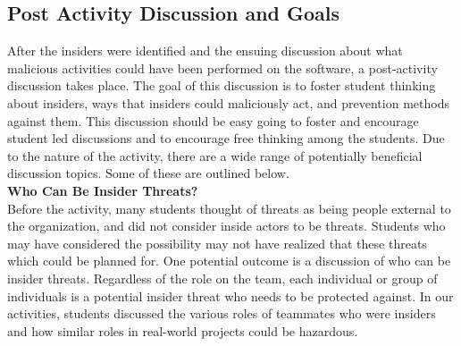 \documentclass[conference]{IEEEtran}
\begin{document}









\subsection{Post Activity Discussion and Goals}

After the insiders were identified and the ensuing discussion about what malicious activities could have been performed on the software, a post-activity discussion takes place. The goal of this discussion is to foster student thinking about insiders, ways that insiders could maliciously act, and prevention methods against them. This discussion should be easy going to foster and encourage student led discussions and to encourage free thinking among the students. Due to the nature of the activity, there are a wide range of potentially beneficial discussion topics. Some of these are outlined below. \\


\textbf{Who Can Be Insider Threats?}\\
Before the activity, many students thought of threats as being people external to the organization, and did not consider inside actors to be threats. Students who may have considered the possibility may not have realized that these threats which could be planned for. One potential outcome is a discussion of who can be insider threats. Regardless of the role on the team, each individual or group of individuals is a potential insider threat who needs to be protected against. In our activities, students discussed the various roles of teammates who were insiders and how similar roles in real-world projects could be hazardous. \\
\end{document}
